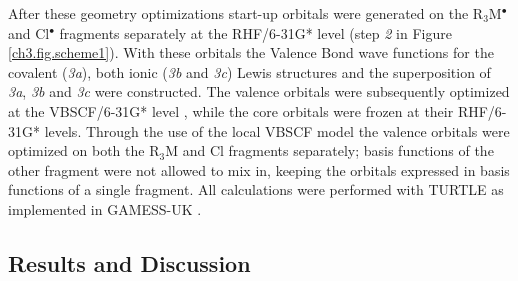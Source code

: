 After these geometry optimizations start-up orbitals were generated on the R$_3$M$^{\bullet}$ and Cl$^{\bullet}$ fragments separately at the \mbox{RHF/6-31G*} level (step \textit{2} in Figure \ref{ch3.fig.scheme1}).  With these orbitals the Valence Bond wave functions for the covalent (\textit{3a}), both ionic (\textit{3b} and \textit{3c}) Lewis structures and the superposition of \textit{3a}, \textit{3b} and \textit{3c} were constructed. The valence orbitals were subsequently optimized at the \mbox{VBSCF/6-31G*} level \cite{vbscf1,vbscf2}, while the core orbitals were frozen at their \mbox{RHF/6-31G*} levels.
Through the use of the local VBSCF model the valence orbitals were optimized on both the R$_3$M and Cl fragments separately; basis functions of the other fragment were not allowed to mix in, keeping the orbitals expressed in basis functions of a single fragment. All calculations were performed with TURTLE \cite{turtle} as implemented in GAMESS-UK \cite{gamess}.

\subsection{Results and Discussion}

